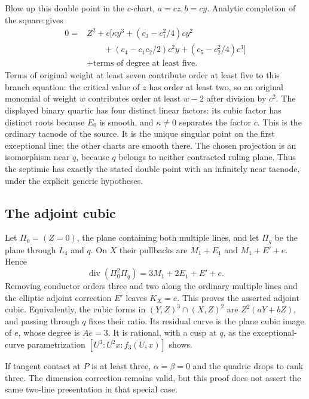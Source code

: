 Blow up this double point in the \(c\)-chart, \(a=cz,b=cy\). Analytic completion of the square gives \[
\begin{aligned}
0={}&Z^2+c\bigl[\kappa y^3+(c_3-c_1^2/4)cy^2\\
&\qquad +(c_4-c_1c_2/2)c^2y+(c_5-c_2^2/4)c^3\bigr]\\
&+\text{terms of degree at least five}.
\end{aligned}
\] Terms of original weight at least seven contribute order at least five to this branch equation: the critical value of \(z\) has order at least two, so an original monomial of weight \(w\) contributes order at least \(w-2\) after division by \(c^2\). The displayed binary quartic has four distinct linear factors: its cubic factor has distinct roots because \(E_0\) is smooth, and \(\kappa\ne0\) separates the factor \(c\). This is the ordinary tacnode of the source. It is the unique singular point on the first exceptional line; the other charts are smooth there. The chosen projection is an isomorphism near \(q\), because \(q\) belongs to neither contracted ruling plane. Thus the septimic has exactly the stated double point with an infinitely near tacnode, under the explicit generic hypotheses.

\subsection{The adjoint cubic}

Let \(\Pi_0=(Z=0)\), the plane containing both multiple lines, and let \(\Pi_q\) be the plane through \(L_4\) and \(q\). On \(X\) their pullbacks are \(M_1+E_1\) and \(M_1+E'+e\). Hence \[
\operatorname{div}(\Pi_0^2\Pi_q)=3M_1+2E_1+E'+e.
\] Removing conductor orders three and two along the ordinary multiple lines and the elliptic adjoint correction \(E'\) leaves \(K_X=e\). This proves the asserted adjoint cubic. Equivalently, the cubic forms in \((Y,Z)^3\cap(X,Z)^2\) are \(Z^2(aY+bZ)\), and passing through \(q\) fixes their ratio. Its residual curve is the plane cubic image of \(e\), whose degree is \(Ae=3\). It is rational, with a cusp at \(q\), as the exceptional-curve parametrization \([U^3:U^2x:f_3(U,x)]\) shows.

If tangent contact at \(P\) is at least three, \(\alpha=\beta=0\) and the quadric drops to rank three. The dimension correction remains valid, but this proof does not assert the same two-line presentation in that special case.

